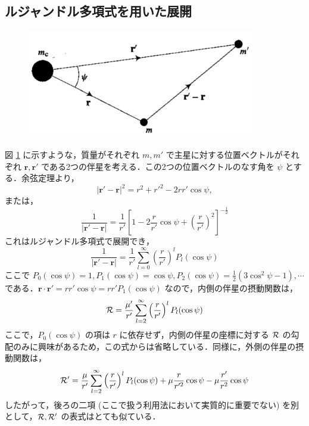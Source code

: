 \documentclass[11pt,a4paper,oneside,onecolumn]{jarticle}
\begin{document}
\subsection{ルジャンドル多項式を用いた展開}
\begin{figure}[H]
\centering
\includegraphics[width=10cm]{./image/sec6_2.pdf}
\caption{\label{fig:disturbingfunc_psi}}
\end{figure}
図 \ref{fig:disturbingfunc_psi} に示すような，質量がそれぞれ $m, m'$ で主星に対する位置ベクトルがそれぞれ ${\bm r}, {\bm r'}$ である2つの伴星を考える．この2つの位置ベクトルのなす角を $\psi$ とする．余弦定理より，
\begin{equation}
|{\bm r'} - {\bm r}|^2 = r^2 + r'^2 - 2 r r' \cos \psi,
\end{equation}
または，
\begin{equation}
\frac{1}{|{\bm r'} - {\bm r}|} = \frac{1}{r'} \left[ 1 - 2 \frac{r}{r'} \cos \psi + \left( \frac{r}{r'} \right)^2 \right]^{-\frac{1}{2}}
\end{equation}
これはルジャンドル多項式で展開でき，
\begin{equation}
\frac{1}{|{\bm r'} - {\bm r}|} = \frac{1}{r'} \sum_{l = 0}^{\infty} \left( \frac{r}{r'} \right)^l P_l (\cos \psi)
\end{equation}
ここで $P_0 (\cos \psi) = 1, P_1 (\cos \psi) = \cos \psi, P_2 (\cos \psi) = \frac{1}{2} (3 \cos^2 \psi - 1), \cdots$ である．${\bm r} \cdot {\bm r'} = r r' \cos \psi = r r' P_1 (\cos \psi)$ なので，内側の伴星の摂動関数は，
\begin{equation}
{\cal R} = \frac{\mu'}{r'} \sum_{l = 2}^{\infty} \left( \frac{r}{r'} \right)^l P_l (\cos \psi) \label{eq:cal_R}
\end{equation}
ここで，$P_0 (\cos \psi)$ の項は $r$ に依存せず，内側の伴星の座標に対する ${\cal R}$ の勾配のみに興味があるため，この式からは省略している．同様に，外側の伴星の摂動関数は，
\begin{equation}
{\cal R'} = \frac{\mu}{r'} \sum_{l = 2}^{\infty} \left( \frac{r}{r'} \right)^l P_l (\cos \psi) + \mu \frac{r}{r'^2} \cos \psi - \mu \frac{r'}{r^2} \cos \psi
\end{equation}
したがって，後ろの二項 (ここで扱う利用法において実質的に重要でない) を別として，${\cal R}, {\cal R'}$ の表式はとても似ている．
\end{document}
